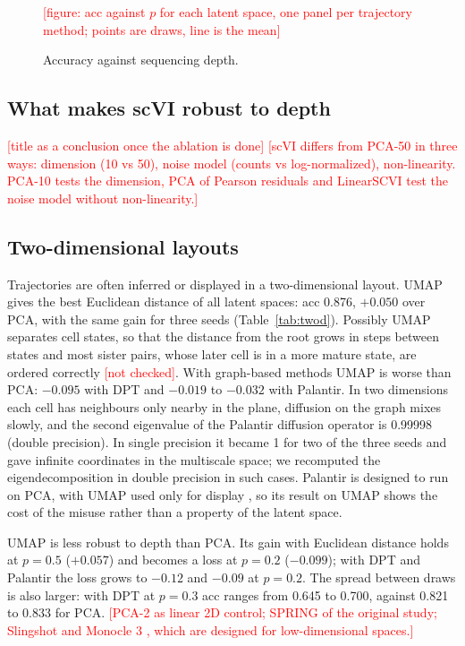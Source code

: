 \documentclass[10pt,a4paper,twocolumn]{article}
\newcommand{\todo}[1]{\textcolor{red}{[#1]}}
\begin{document}
\begin{figure}[t]
\centering
\todo{figure: acc against $p$ for each latent space, one panel per trajectory method; points are
draws, line is the mean}
\caption{Accuracy against sequencing depth.}
\label{fig:thin}
\end{figure}

\subsection{What makes scVI robust to depth}
\todo{title as a conclusion once the ablation is done}
\todo{scVI differs from PCA-50 in three ways: dimension (10 vs 50), noise model (counts vs
log-normalized), non-linearity. PCA-10 tests the dimension, PCA of Pearson residuals and
LinearSCVI test the noise model without non-linearity.}

\subsection{Two-dimensional layouts}
\label{sec:twod}
Trajectories are often inferred or displayed in a two-dimensional layout. UMAP gives the best
Euclidean distance of all latent spaces: acc 0.876, $+0.050$ over PCA, with the same gain for
three seeds (Table~\ref{tab:twod}). Possibly UMAP separates cell states, so that the distance from
the root grows in steps between states and most sister pairs, whose later cell is in a more
mature state, are ordered correctly \todo{not checked}. With graph-based methods UMAP is worse
than PCA: $-0.095$ with DPT and $-0.019$ to $-0.032$ with Palantir. In two dimensions each cell has
neighbours only nearby in the plane, diffusion on the graph mixes slowly, and the second
eigenvalue of the Palantir diffusion operator is 0.99998 (double precision). In single precision it
became 1 for two of the three seeds and gave infinite coordinates in the multiscale space; we
recomputed the eigendecomposition in double precision in such cases. Palantir is designed to run on PCA, with UMAP used only for
display \cite{setty2019palantir}, so its result on UMAP shows the cost of the misuse rather than a
property of the latent space.

UMAP is less robust to depth than PCA. Its gain with Euclidean distance holds at $p=0.5$
($+0.057$) and becomes a loss at $p=0.2$ ($-0.099$); with DPT and Palantir the loss grows to
$-0.12$ and $-0.09$ at $p=0.2$. The spread between draws is also larger: with DPT at $p=0.3$ acc
ranges from 0.645 to 0.700, against 0.821 to 0.833 for PCA. \todo{PCA-2 as linear 2D control;
SPRING of the original study; Slingshot and Monocle 3 \cite{TODO-cao2019monocle3}, which are
designed for low-dimensional spaces.}
\end{document}
